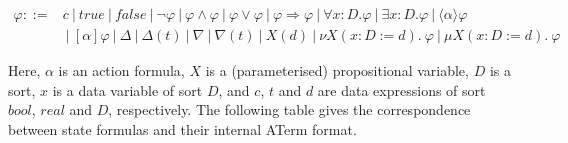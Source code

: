 \[
\begin{array}{lc}
\varphi ::= &
c
~|~ true
~|~ false
~|~ \neg \varphi
~|~ \varphi \wedge \varphi
~|~ \varphi \vee \varphi
~|~ \varphi \Rightarrow \varphi
~|~ \forall x{:}D .\varphi
~|~ \exists x{:}D .\varphi
~|~ \langle\alpha\rangle \varphi \\ &
~|~ [\alpha] \varphi
~|~ \Delta
~|~ \Delta(t)
~|~ \nabla
~|~ \nabla(t)
~|~ X(d)
~|~ \nu  X(x{:}D:=d).~\varphi
~|~ \mu  X(x{:}D:=d).~\varphi
\end{array}
\]

Here, $\alpha$ is an action formula, $X$ is a (parameterised) propositional variable, $D$ is a
sort, $x$ is a data variable of sort $D$, and $c$, $t$ and $d$ are data expressions of sort
$bool$, $real$ and $D$, respectively. The following table gives the correspondence between
state formulas and their internal ATerm format.


